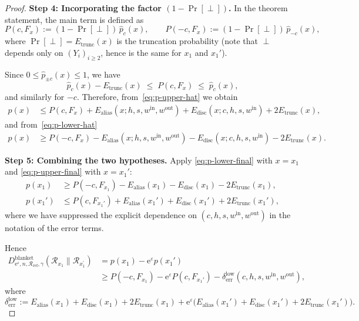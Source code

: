 \documentclass{article}
\theoremstyle{plain}
\theoremstyle{definition}
\begin{document}
\begin{proof}
\medskip

\textbf{Step 4: Incorporating the factor $(1-\Pr[\perp])$.}
In the theorem statement, the main term is defined as
\[
  P(c,F_x)
  :=
  (1-\Pr[\perp])\,
  \widehat p_c(x),
  \qquad
  P(-c,F_x)
  :=
  (1-\Pr[\perp])\,
  \widehat p_{-c}(x),
\]
where $\Pr[\perp]=E_{\mathrm{trunc}}(x)$ is the truncation probability (note that $\perp$
depends only on $(Y_i)_{i\ge2}$, hence is the same for $x_1$ and $x_1'$).

Since $0\le\widehat p_{\pm c}(x)\le1$, we have
\[
  \widehat p_c(x) - E_{\mathrm{trunc}}(x)
  \;\le\;
  P(c,F_x)
  \;\le\;
  \widehat p_c(x),
\]
and similarly for $-c$.
Therefore, from~\eqref{eq:p-upper-hat} we obtain
\begin{align}
  p(x)
  &\le
  P(c,F_x)
  + E_{\mathrm{alias}}(x;h,s,w^{\mathrm{in}},w^{\mathrm{out}})
  + E_{\mathrm{disc}}(x;c,h,s,w^{\mathrm{in}})
  + 2E_{\mathrm{trunc}}(x),
  \label{eq:p-upper-final}
\end{align}
and from~\eqref{eq:p-lower-hat}
\begin{align}
  p(x)
  &\ge
  P(-c,F_x)
  - E_{\mathrm{alias}}(x;h,s,w^{\mathrm{in}},w^{\mathrm{out}})
  - E_{\mathrm{disc}}(x;c,h,s,w^{\mathrm{in}})
  - 2E_{\mathrm{trunc}}(x).
  \label{eq:p-lower-final}
\end{align}

\medskip

\textbf{Step 5: Combining the two hypotheses.}
Apply \eqref{eq:p-lower-final} with $x=x_1$ and \eqref{eq:p-upper-final} with $x=x_1'$:
\begin{align*}
  p(x_1)
  &\ge
  P(-c,F_{x_1})
  - E_{\mathrm{alias}}(x_1)
  - E_{\mathrm{disc}}(x_1)
  - 2E_{\mathrm{trunc}}(x_1), \\
  p(x_1')
  &\le
  P(c,F_{x_1'})
  + E_{\mathrm{alias}}(x_1')
  + E_{\mathrm{disc}}(x_1')
  + 2E_{\mathrm{trunc}}(x_1'),
\end{align*}
where we have suppressed the explicit dependence on $(c,h,s,w^{\mathrm{in}},w^{\mathrm{out}})$
in the notation of the error terms.

Hence
\begin{align*}
  D_{\mathrm{e}^\varepsilon,n,\mathcal{R}_\mathrm{ref},\gamma}^\mathrm{blanket}(\mathcal{R}_{x_1} \| \mathcal{R}_{x_1^\prime})
  &= p(x_1) - \mathrm e^\varepsilon p(x_1') \\
  &\ge
  P(-c,F_{x_1}) - \mathrm e^\varepsilon P(c,F_{x_1'})
  - \delta_{\mathrm{err}}^{\mathrm{low}}(c,h,s,w^{\mathrm{in}},w^{\mathrm{out}}),
\end{align*}
where
\[
  \delta_{\mathrm{err}}^{\mathrm{low}}
  :=
  E_{\mathrm{alias}}(x_1)
  + E_{\mathrm{disc}}(x_1)
  + 2E_{\mathrm{trunc}}(x_1)
  + \mathrm e^\varepsilon\bigl(
    E_{\mathrm{alias}}(x_1')
    + E_{\mathrm{disc}}(x_1')
    + 2E_{\mathrm{trunc}}(x_1')
  \bigr).
\]


\end{proof}
\end{document}
